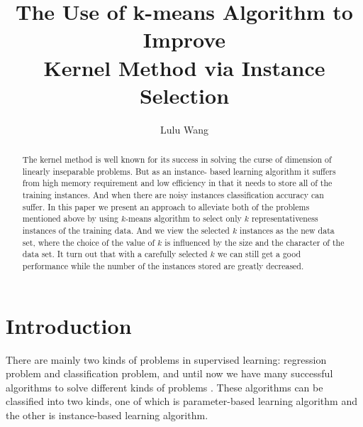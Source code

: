 \documentclass[runningheads,a4paper]{llncs}
\begin{document}
\mainmatter  

\title{The Use of k-means Algorithm to Improve\\Kernel Method via Instance
		Selection}


\author{Lulu Wang}




\maketitle



\begin{abstract}
		The kernel method is well known for its success in solving the
		curse of dimension of linearly inseparable problems. But as an instance-
		based learning algorithm it suffers from high memory requirement and
		low efficiency in that it needs to store all of the training instances. And
		when there are noisy instances classification accuracy can suffer. In this
		paper we present an approach to alleviate both of the problems mentioned
		above by using $k$-means algorithm to select only $k$ representativeness
		instances of the training data. And we view the selected $k$ instances
		as the new data set, where the choice of the value of $k$ is influenced
		by the size and the character of the data set. It turn out
		that with a carefully selected $k$ we can still get a good performance
		while the number of the instances stored are greatly decreased.


\end{abstract}


\section{Introduction}
		There are mainly two kinds of problems in supervised learning: regression problem
 		and classification problem, and until now we have many successful algorithms
		to solve different kinds of problems \cite{jour1}. These algorithms can be
		classified into two kinds, one of which is parameter-based learning algorithm
		and the other is instance-based learning algorithm.
\end{document}
